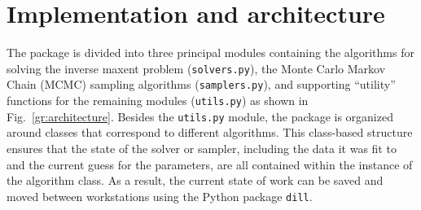 \documentclass{jors}
\begin{document}
%
%


\section*{Implementation and architecture}
The package is divided into three principal modules containing the algorithms for solving the inverse maxent problem ({\tt solvers.py}), the Monte Carlo Markov Chain (MCMC) sampling algorithms ({\tt samplers.py}), and supporting ``utility'' functions for the remaining modules ({\tt utils.py}) as shown in Fig.~\ref{gr:architecture}.
Besides the {\tt utils.py} module, the package is organized around classes that correspond to different algorithms. This class-based structure ensures that the state of the solver or sampler, including the data it was fit to and the current guess for the parameters, are all contained within the instance of the algorithm class. As a result, the current state of work can be saved and moved between workstations using the Python package {\tt dill}.
\end{document}
